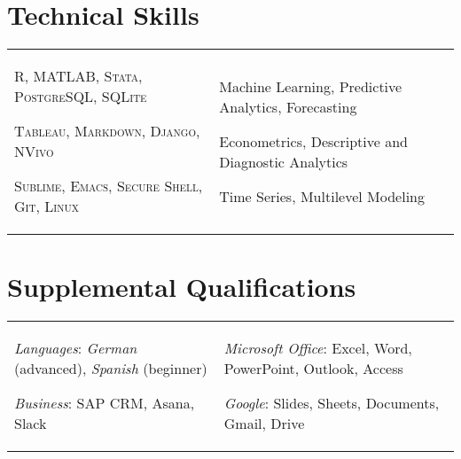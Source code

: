 \documentclass[a4paper,10pt]{article}
\begin{document}
\section{Technical Skills}
\begin{supertabular}{p{8.65cm} p{8.65cm}}

	\begin{enumerate*}[label =$\circ$, itemjoin={\newline}]
																\item \small \textsc{R, MATLAB, Stata, PostgreSQL, SQLite}
																\item \small \textsc{Tableau, Markdown, Django, NVivo}
																\item \small \textsc{Sublime, Emacs, Secure Shell, Git, Linux}
																\end{enumerate*}


	& \begin{enumerate*}[label =$\circ$, itemjoin={\newline}]
                                \item \small Machine Learning, Predictive Analytics, Forecasting
                                \item \small Econometrics, Descriptive and Diagnostic Analytics
                                \item \small Time Series, Multilevel Modeling \end{enumerate*}  \vspace{2mm} \\



\end{supertabular}



\smallskip
\section{Supplemental Qualifications}
\begin{supertabular}{p{8.65cm} p{8.65cm}}
	\begin{enumerate*}[label =$\circ$, itemjoin={\newline}]
		\item \small \emph{Languages}: \emph{German} (advanced), \emph{Spanish} (beginner)
	 	\item \small \emph{Business}: SAP CRM, Asana, Slack
	\end{enumerate*}

	& \begin{enumerate*}[label =$\circ$, itemjoin={\newline}]
	 	\item \small \emph{Microsoft Office}: Excel, Word, PowerPoint, Outlook, Access
	 	\item \small \emph{Google}: Slides, Sheets, Documents, Gmail, Drive
	\end{enumerate*} \\

\end{supertabular}
\end{document}
